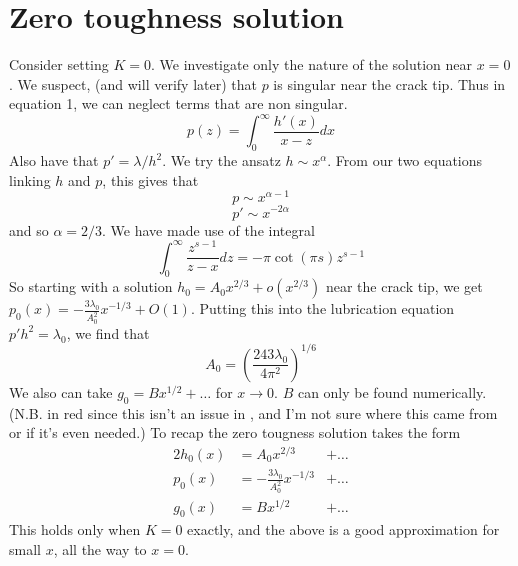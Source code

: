 \documentclass{article}
\begin{document}
\section{Zero toughness solution}
% 
Consider setting $K=0$. We investigate only the nature of the solution near
$x=0$. We suspect, (and will verify later) that $p$ is singular near the crack
tip. Thus in equation 1, we can neglect terms that are non singular. 
\[ p(z) = \int_0^{\infty} \frac{h'(x)}{x-z} dx \]
Also have that $p' = \lambda/h^2$. We try the ansatz $h \sim x^{\alpha}$. From
our two equations linking $h$ and $p$, this gives that
\[ p \sim x^{\alpha-1} \]
\[ p' \sim x^{-2\alpha} \]
and so $\alpha = 2/3$. We have made use of the integral
\[ \int_0^\infty \frac{z^{s-1}}{z-x}dz = -\pi \cot (\pi s)z^{s-1} \]
So starting with a solution $h_0 = A_0 x^{2/3} + o(x^{2/3})$ near the
crack tip, we get $\displaystyle p_0(x) = -\frac{3\lambda_0}{A_0^2}x^{-1/3} 
+ O(1)$. Putting this into the lubrication equation $p' h^2 = \lambda_0$, 
we find that 
\[ A_0 = \left( \frac{243 \lambda_0}{4\pi^2} \right)^{1/6} \]
{\color{red}We also can take $g_0 = Bx^{1/2}+\dots$ for $x\to0$. $B$ can only
be found numerically. (N.B. in red since this isn't an issue in \cite{GandD},
and I'm not sure where this came from or if it's even needed.)}
To recap the zero tougness solution takes the form
\begin{alignat*}{2}
h_0(x) &= A_0 x^{2/3} &+ \dots \\
p_0(x) &= -\frac{3\lambda_0}{A_0^2} x^{-1/3} &+ \dots \\
g_0(x) &= Bx^{1/2} &+ \dots 
\end{alignat*}
This holds only when $K=0$ exactly, and the above is a good approximation
for small $x$, all the way to $x=0$.
%
\end{document}
